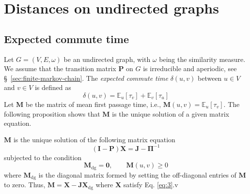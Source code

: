 \chapter{Distances on undirected graphs}
\label{cha:dist-undir-graphs}
\section{Expected commute time}
\label{sec:expect-comm-time}
Let $G = (V,E,\omega)$ be an undirected graph, with $\omega$ being the
similarity measure. We assume that the transition matrix
$\mathbf{P}$ on $G$ is irreducible and aperiodic, see
\S ~\ref{sec:finite-markov-chain}. The {\em expected commute time}
$\delta(u,v)$ between $u \in V$ and $v \in V$ is defined as
\begin{equation}
  \label{eq:25}
  \delta(u,v) = \mathbb{E}_{u}[\tau_v] + \mathbb{E}_{v}[\tau_u]
\end{equation}
Let $\mathbf{M}$ be the matrix of mean first passage time, i.e.,
$\mathbf{M}(u,v) = \mathbb{E}_{u}[\tau_v]$. The following proposition
shows that $\mathbf{M}$ is the unique solution of a given matrix equation. 
\begin{proposition}
  \label{prop:4}
 $\mathbf{M}$ is the unique solution of the following matrix equation
  \begin{equation}
    \label{eq:3}
   (\mathbf{I} - \mathbf{P})\mathbf{X} = \mathbf{J} - \bm{\Pi}^{-1}
  \end{equation}
  subjected to the condition 
  \begin{equation}
    \label{eq:32}
 \mathbf{M}_{\mathrm{dg}} = \mathbf{0}, \qquad \mathbf{M}(u,v) \geq 0   
  \end{equation}
  where $\mathbf{M}_{\mathrm{dg}}$ is the diagonal matrix formed
    by setting the off-diagonal entries of $\mathbf{M}$ to zero.
    Thus, $\mathbf{M} = \mathbf{X} -
    \mathbf{J}\mathbf{X}_{\mathrm{dg}}$ where $\mathbf{X}$ satisfy
    Eq. \eqref{eq:3}.v
\end{proposition}
